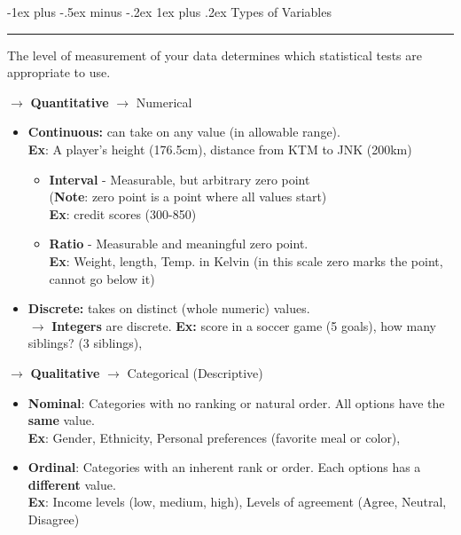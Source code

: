 \documentclass[letterpaper, 10.5pt,landscape]{article}
\makeatletter
\renewcommand{\subsubsection}{\@startsection{subsubsection}{3}{0mm}%
                                {-1ex plus -.5ex minus -.2ex}%
                                {1ex plus .2ex}%
                                {\normalfont\small\bfseries}}
\makeatother
\begin{document}
\begin{multicols*}{3}
\subsubsection{Types of Variables} {\color{teal}\hrule height 0.5pt} \smallskip

The level of measurement of your data determines which statistical tests are appropriate to use. 


$\rightarrow$  \textbf{Quantitative} $\rightarrow$ Numerical 
\begin{itemize}[leftmargin=0.8cm]
    \vspace{-3pt}
    \item \textbf{Continuous:} can take on any value (in allowable range). \\ \textbf{Ex}: A player's height (176.5cm), distance from KTM to JNK (200km)    
    \begin{itemize}[leftmargin=0.4cm]
        \vspace{-3pt}
        \item \textbf{Interval} - Measurable, but arbitrary zero point \\
        (\textbf{Note}: zero point is a point where all values start) \\
        \textbf{Ex}: credit scores (300-850)
        \vspace{-3pt}
        \item \textbf{Ratio} - Measurable and meaningful zero point. \\
        \textbf{Ex}: Weight, length, Temp. in Kelvin (in this scale zero marks the point, cannot go below it)
        \vspace{-3pt}
    \end{itemize}
    \item \textbf{Discrete:} takes on distinct (whole numeric) values. \\ $\rightarrow$ \textbf{Integers} are discrete. \textbf{Ex:} score in a soccer game (5 goals), how many siblings? (3 siblings), 
\end{itemize}

$\rightarrow$ \textbf{Qualitative} $\rightarrow$ Categorical (Descriptive) 
\begin{itemize}[leftmargin=0.8cm]
 \vspace{-3pt}
    \item \textbf{Nominal}: Categories with no ranking or natural order. All options have the \textbf{same} value. \\
    \textbf{Ex}: Gender, Ethnicity, Personal preferences (favorite meal or color),
     \vspace{-3pt}
    \item \textbf{Ordinal}: Categories with an inherent rank or order. Each options has a \textbf{different} value. \\
    \textbf{Ex}: Income levels (low, medium, high), Levels of agreement (Agree, Neutral, Disagree)
     \vspace{-3pt}
\end{itemize}




\end{multicols*}
\end{document}
